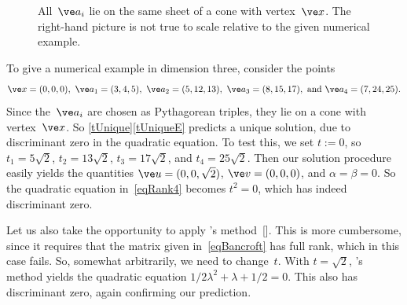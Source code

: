 \documentclass[reqno]{amsart}
\begin{document}
\begin{ex}
\begin{figure}[htbp]
     \caption{All~$\ve a_i$ lie on the same sheet of a cone with
       vertex~$\ve x$. The right-hand picture is not true to scale
       relative to the given numerical example.}
    \label{fCone}
  \end{figure}

  To give a numerical example in dimension three, consider the points
  \[
    \ve x = (0,0,0), \ \ve a_1 = (3,4,5), \ \ve a_2 = (5,12,13), \ \ve
    a_3 = (8,15,17), \ \text{and} \ \ve a_4 = (7,24,25).
  \]
  Since the~$\ve a_i$ are chosen as Pythagorean triples, they lie on a
  cone with vertex~$\ve x$. So \cref{tUnique}\ref{tUniqueE} predicts a
  unique solution, due to discriminant zero in the quadratic
  equation. To test this, we set $t := 0$, so $t_1 = 5 \sqrt 2$,
  $t_2 = 13 \sqrt 2$, $t_3 = 17 \sqrt 2$, and $t_4 = 25 \sqrt 2$. Then
  our solution procedure easily yields the quantities
  $\ve u = (0,0,\sqrt 2)$, $\ve v = (0,0,0)$, and
  $\alpha = \beta = 0$. So the quadratic equation in~\eqref{eqRank4}
  becomes $t^2 = 0$, which has indeed discriminant zero.

  Let us also take the opportunity to apply 's
  method~[]. This is more cumbersome, since
  it requires that the matrix given in~\eqref{eqBancroft} has full
  rank, which in this case fails. So, somewhat arbitrarily, we need to
  change~$t$. With $t = \sqrt 2$, 's method
  yields the quadratic equation $1/2 \lambda^2 + \lambda + 1/2 =
  0$. This also has discriminant zero, again confirming our
  prediction.


\end{ex}
\end{document}
